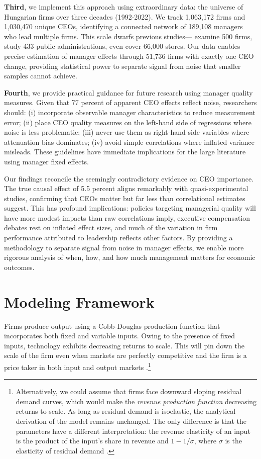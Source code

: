 \documentclass[11pt,a4paper]{article}
\begin{document}
\textbf{Third}, we implement this approach using extraordinary data: the universe of Hungarian firms over three decades (1992-2022). We track 1,063,172 firms and 1,030,470 unique CEOs, identifying a connected network of 189,108 managers who lead multiple firms. This scale dwarfs previous studies---\citet{fee2013managers} examine 500 firms, \citet{fenizia2022managers} study 433 public administrations, even \citet{metcalfe2023managers} cover 66,000 stores. Our data enables precise estimation of manager effects through 51,736 firms with exactly one CEO change, providing statistical power to separate signal from noise that smaller samples cannot achieve.

\textbf{Fourth}, we provide practical guidance for future research using manager quality measures. Given that 77 percent of apparent CEO effects reflect noise, researchers should: (i) incorporate observable manager characteristics to reduce measurement error; (ii) place CEO quality measures on the left-hand side of regressions where noise is less problematic; (iii) never use them as right-hand side variables where attenuation bias dominates; (iv) avoid simple correlations where inflated variance misleads. These guidelines have immediate implications for the large literature using manager fixed effects.

Our findings reconcile the seemingly contradictory evidence on CEO importance. The true causal effect of 5.5 percent aligns remarkably with quasi-experimental studies, confirming that CEOs matter but far less than correlational estimates suggest. This has profound implications: policies targeting managerial quality will have more modest impacts than raw correlations imply, executive compensation debates rest on inflated effect sizes, and much of the variation in firm performance attributed to leadership reflects other factors. By providing a methodology to separate signal from noise in manager effects, we enable more rigorous analysis of when, how, and how much management matters for economic outcomes.


\section{Modeling Framework}
Firms produce output using a Cobb-Douglas production function that incorporates both fixed and variable inputs. Owing to the presence of fixed inputs, technology exhibits decreasing returns to scale. This will pin down the scale of the firm even when markets are perfectly competitive and the firm is a price taker in both input and output markets \citep{AtkesonKehoe2005JPE,McGrattan2012RED}.\footnote{Alternatively, we could assume that firms face downward sloping residual demand curves, which would make the \emph{revenue production function} decreasing returns to scale. As long as residual demand is isoelastic, the analytical derivation of the model remains unchanged. The only difference is that the parameters have a different interpretation: the revenue elasticity of an input is the product of the input's share in revenue and $1-1/\sigma$, where $\sigma$ is the elasticity of residual demand \citep{DeLoecker2011Econometrica}.}
\end{document}
